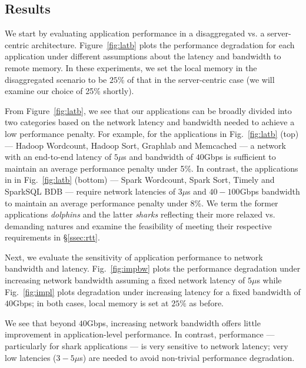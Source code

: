 \subsection{Results}
\label{ssec:rr}
We start by evaluating application performance in a disaggregated vs. a server-centric architecture. 
Figure~\ref{fig:latb} plots the performance degradation for each application under different assumptions about the latency and bandwidth to remote memory. In these experiments, we set the local memory in the disaggregated scenario to be  $25\%$ of that in the server-centric case (we will examine our choice of 25\% shortly). 

From Figure~\ref{fig:latb}, we see that our applications can be broadly divided into two categories based on the network latency and bandwidth needed to achieve a low performance penalty.
For example, for the applications in Fig.~\ref{fig:latb} (top) --- Hadoop Wordcount, Hadoop Sort, Graphlab and Memcached --- a network with an end-to-end latency of $5\mu$s and bandwidth of $40$Gbps is sufficient to maintain an average performance penalty under 5\%. 
In contrast, the applications in in Fig.~\ref{fig:latb} (bottom) --- Spark Wordcount, Spark Sort, Timely and SparkSQL BDB --- require network latencies of $3\mu$s and $40-100$Gbps bandwidth to maintain an average performance penalty under 8\%. We term the former applications {\em dolphins} and the latter {\em sharks} reflecting their more relaxed vs. demanding natures and examine the feasibility of meeting their respective requirements in \S\ref{ssec:rtt}.



Next, we evaluate the sensitivity of application performance to network bandwidth and latency. Fig.~\ref{fig:impbw} plots the performance degradation under increasing network bandwidth assuming a fixed network latency of $5\mu$s while Fig.~\ref{fig:impl} plots degradation under increasing latency for a fixed bandwidth of $40$Gbps; in both cases, local memory is set at $25\%$ as before.

We see that beyond $40$Gbps, increasing network bandwidth offers little improvement in application-level performance. 
In contrast, performance --- particularly for shark applications --- is very sensitive to network latency; very low latencies ($3-5\mu$s) are needed to avoid non-trivial performance degradation.

